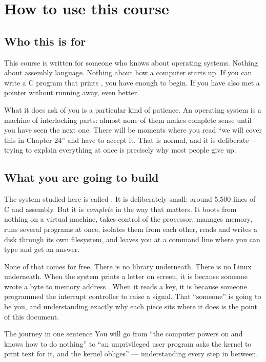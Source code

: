 \chapter*{How to use this course}

\section*{Who this is for}

This course is written for someone who knows  about operating systems. Nothing
about assembly language. Nothing about how a computer starts up. If you can write a C program
that prints , you have enough to begin. If you have also met a pointer without
running away, even better.

What it does ask of you is a particular kind of patience. An operating system is a machine of
interlocking parts: almost none of them makes complete sense until you have seen the next one.
There will be moments where you read ``we will cover this in Chapter 24'' and have to accept it.
That is normal, and it is deliberate --- trying to explain everything at once is precisely why
most people give up.

\section*{What you are going to build}

The system studied here is called . It is deliberately small: around 5,500
lines of C and assembly. But it is \emph{complete} in the way that matters. It boots from nothing
on a virtual machine, takes control of the processor, manages memory, runs several programs at
once, isolates them from each other, reads and writes a disk through its own filesystem, and
leaves you at a command line where you can type  and get an answer.

None of that comes for free. There is no library underneath. There is no Linux underneath. When
the system prints a letter on screen, it is because someone wrote a byte to memory address
. When it reads a key, it is because someone programmed the interrupt controller to
raise a signal. That ``someone'' is going to be you, and understanding exactly why each piece sits
where it does is the point of this document.

\begin{concept}{The journey in one sentence}
You will go from ``the computer powers on and knows how to do nothing'' to ``an unprivileged user
program asks the kernel to print text for it, and the kernel obliges'' --- understanding every
step in between.
\end{concept}

